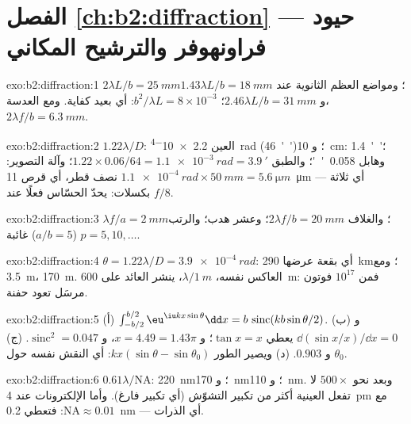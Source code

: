 \section*{الفصل \ref{ch:b2:diffraction} --- حيود فراونهوفر والترشيح المكاني}

\begin{solution}{exo:b2:diffraction:1}
$2\lambda L/b = \qty{25}{mm}$؛ ومواضع العظم الثانوية عند $1.43\lambda L/b = \qty{18}{mm}$ و
$2.46\lambda L/b = \qty{31}{mm}$؛  $b^2/\lambda L = 8 \times 10^{-3}$: أي بعيد
كفاية. ومع العدسة، $2\lambda f/b = \qty{6.3}{mm}$.
\end{solution}

\begin{solution}{exo:b2:diffraction:2}
$1.22\lambda/D$: العين \qty{2.2e-4}{rad} (\qty{46}{''})؛ و \qty{10}{cm}: \qty{1.4}{''}؛ وهابل
\qty{0.058}{''}؛ والطبق $1.22 \times 0.06/64 = \qty{1.1e-3}{rad} = \qty{3.9}{'}$؛ وآلة التصوير:
$\qty{1.1e-4}{rad} \times \qty{50}{mm} = \qty{5.6}{\micro m}$ نصف قطر، أي قرص \qty{11}{\micro m} ---
أي ثلاثة بكسلات:  يحدّ الحسّاس فعلًا عند $f/8$.
\end{solution}

\begin{solution}{exo:b2:diffraction:3}
$\lambda f/a = \qty{2}{mm}$؛ والغلاف $2\lambda f/b = \qty{20}{mm}$؛ وعشر هدب؛ والرتب
$p = 5, 10, \dots$ ($a/b = 5$) غائبة.
\end{solution}

\begin{solution}{exo:b2:diffraction:4}
$\theta = 1.22\lambda/D = \qty{3.9e-4}{rad}$: أي بقعة عرضها \qty{290}{km}؛ ومع \qty{3.5}{m}،
\qty{170}{m}.  العاكس نفسه، $\lambda/\qty{1}{m}$، ينشر
العائد على \qty{600}{m}: فمن $10^{17}$ فوتون مرسَل تعود حفنة.
\end{solution}

\begin{solution}{exo:b2:diffraction:5}
(أ) $\int_{-b/2}^{b/2}\eu^{\iu kx\sin\theta}\dd x = b\,\operatorname{sinc}(kb\sin\theta/2)$. (ب)
و $\dd(\sin x/x)/\dd x = 0$ يعطي $\tan x = x$؛ و $x = 4.49 = 1.43\pi$، و $\operatorname{sinc}^2 =
0.047$. (ج) و $0.903$. (د) ويصير الطور $kx(\sin\theta - \sin\theta_0)$: أي
النقش نفسه حول $\theta_0$.
\end{solution}

\begin{solution}{exo:b2:diffraction:6}
$0.61\lambda/\mathrm{NA}$: \qty{220}{nm}؛ و \qty{170}{nm}؛ و \qty{110}{nm}. وبعد نحو $500\times$
لا تفعل العينية أكثر من تكبير التشوّش (أي تكبير فارغ). وأما الإلكترونات
عند \qty{4}{pm} مع $\mathrm{NA} \approx 0.01$: فتعطي \qty{0.2}{nm} --- أي الذرات.
\end{solution}

